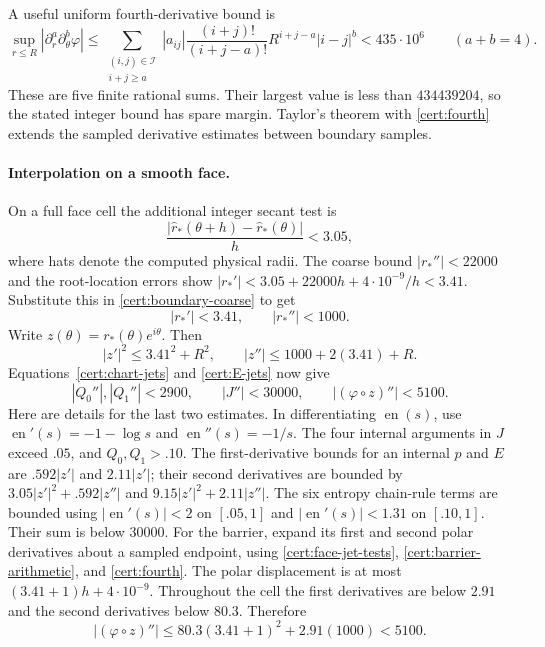 \documentclass[11pt]{article}
\numberwithin{equation}{section}
\theoremstyle{definition}
\theoremstyle{remark}
\begin{document}
A useful uniform fourth-derivative bound is
\begin{equation}\label{cert:fourth}
 \sup_{r\leq R}|\partial_r^a\partial_\theta^b\varphi|
 \leq\sum_{\substack{(i,j)\in\mathcal I\\i+j\geq a}}
 |a_{ij}|\frac{(i+j)!}{(i+j-a)!}R^{i+j-a}|i-j|^b
 <435\cdot10^6\qquad(a+b=4).
\end{equation}
These are five finite rational sums.  Their largest value is less than
$434439204$, so the stated integer bound has spare margin.  Taylor's
theorem with \eqref{cert:fourth} extends the sampled derivative estimates
between boundary samples.

\paragraph{Interpolation on a smooth face.}
On a full face cell the additional integer secant test is
\[
 \frac{|\widehat r_*(\theta+h)-\widehat r_*(\theta)|}{h}<3.05,
\]
where hats denote the computed physical radii.  The coarse bound
$|r_*''|<22000$ and the root-location errors show
$|r_*'|<3.05+22000h+4\cdot10^{-9}/h<3.41$.  Substitute this in
\eqref{cert:boundary-coarse} to get
\begin{equation}\label{cert:boundary-fine}
 |r_*'|<3.41,\qquad |r_*''|<1000.
\end{equation}
Write $z(\theta)=r_*(\theta)e^{i\theta}$.  Then
\[
 |z'|^2\leq3.41^2+R^2,\qquad |z''|\leq1000+2(3.41)+R.
\]
Equations~\eqref{cert:chart-jets} and \eqref{cert:E-jets} now give
\begin{equation}\label{cert:face-curvature}
 |Q_0''|,|Q_1''|<2900,\qquad |J''|<30000,\qquad
 |(\varphi\circ z)''|<5100.
\end{equation}
Here are details for the last two estimates.  In differentiating $\operatorname{en}(s)$,
use $\operatorname{en}'(s)=-1-\log s$ and $\operatorname{en}''(s)=-1/s$.
The four internal arguments in $J$ exceed $.05$, and $Q_0,Q_1>.10$.
The first-derivative bounds for an internal $p$ and $E$ are
$.592|z'|$ and $2.11|z'|$; their second derivatives are bounded by
$3.05|z'|^2+.592|z''|$ and $9.15|z'|^2+2.11|z''|$.
The six entropy chain-rule terms are bounded using
$|\operatorname{en}'(s)|<2$ on $[.05,1]$ and $|\operatorname{en}'(s)|<1.31$ on $[.10,1]$.
Their sum is below 30000.  For the barrier, expand its first and second
polar derivatives about a sampled endpoint, using
\eqref{cert:face-jet-tests}, \eqref{cert:barrier-arithmetic}, and
\eqref{cert:fourth}.  The polar displacement is at most
$(3.41+1)h+4\cdot10^{-9}$.  Throughout the cell the first derivatives
are below $2.91$ and the second derivatives below $80.3$.  Therefore
\[
 |(\varphi\circ z)''|
 \leq80.3(3.41+1)^2+2.91(1000)<5100.
\]
\end{document}
